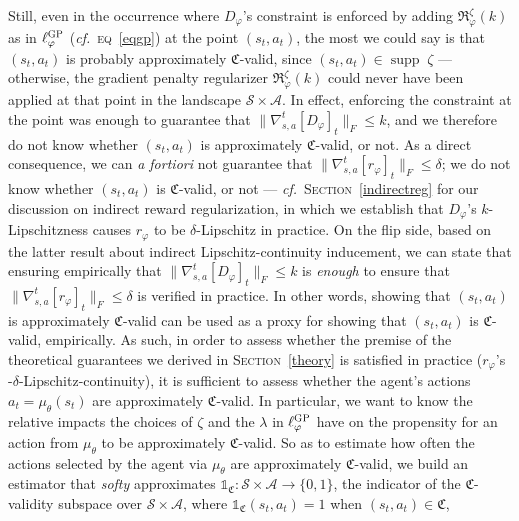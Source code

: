 Still, even in the occurrence where $D_\varphi$'s constraint is enforced
by adding $\mathfrak{R}_\varphi^\zeta (k)$ as in $\ell_\varphi^\textsc{GP}$ (\textit{cf.}~\textsc{eq}~\ref{eqgp})
at the point $(s_t,a_t)$,
the most we could say
is that $(s_t,a_t)$ is probably approximately $\mathfrak{C}$-valid,
since $(s_t,a_t) \in \operatorname{supp} \; \zeta$
--- otherwise, the gradient penalty regularizer $\mathfrak{R}_\varphi^\zeta (k)$
could never have been applied at that point in the landscape
$\mathcal{S} \times \mathcal{A}$.
In effect, enforcing the constraint at the point was enough to guarantee
that $\lVert \nabla_{s,a}^t[D_\varphi]_t \rVert _F \leq k$, and we therefore do not know whether
$(s_t,a_t)$ is approximately $\mathfrak{C}$-valid, or not.
As a direct consequence, we can \textit{a fortiori} not guarantee that
$\lVert \nabla_{s,a}^t[r_\varphi]_t \rVert _F \leq \delta$; we do not know whether
$(s_t,a_t)$ is $\mathfrak{C}$-valid, or not
--- \textit{cf.}~\textsc{Section}~\ref{indirectreg} for our discussion on indirect reward regularization,
in which we establish that $D_\varphi$'s $k$-Lipschitzness causes $r_\varphi$ to be
$\delta$-Lipschitz in practice.
On the flip side, based on the latter result about indirect Lipschitz-continuity inducement,
we can state that ensuring empirically that $\lVert \nabla_{s,a}^t[D_\varphi]_t \rVert _F \leq k$
is \emph{enough} to ensure that $\lVert \nabla_{s,a}^t[r_\varphi]_t \rVert _F \leq \delta$ is verified in practice.
In other words, showing that $(s_t,a_t)$ is approximately $\mathfrak{C}$-valid can be used as
a proxy for showing that $(s_t,a_t)$ is $\mathfrak{C}$-valid, empirically.
As such, in order to assess whether the premise of the theoretical guarantees we derived in
\textsc{Section}~\ref{theory} is satisfied in practice ($r_\varphi$'s -$\delta$-Lipschitz-continuity),
it is sufficient to assess whether the agent's actions $a_t = \mu_\theta (s_t)$
are approximately $\mathfrak{C}$-valid.
In particular, we want to know the relative impacts
the choices of $\zeta$ and the $\lambda$ in $\ell_\varphi^\textsc{GP}$
have on the propensity for an action from $\mu_\theta$ to be approximately $\mathfrak{C}$-valid.
So as to estimate how often the actions selected by the agent via $\mu_\theta$ are approximately $\mathfrak{C}$-valid,
we build an estimator that \emph{softy} approximates
$\mathds{1}_\mathfrak{C}: \mathcal{S} \times \mathcal{A} \to \{0,1\}$,
the indicator of the $\mathfrak{C}$-validity subspace over $\mathcal{S} \times \mathcal{A}$, where
$\mathds{1}_\mathfrak{C}(s_t,a_t) = 1$ when $(s_t,a_t) \in \mathfrak{C}$,
